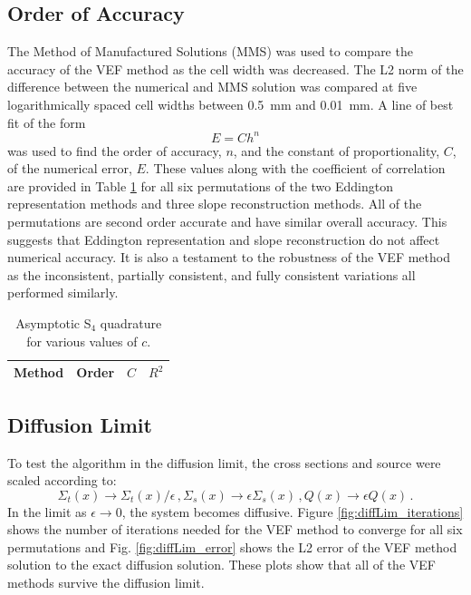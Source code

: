 \subsection{Order of Accuracy}
The Method of Manufactured Solutions (MMS) was used to compare the accuracy of the VEF method as the cell width was decreased. The L2 norm of the difference between the numerical and MMS solution was compared at five logarithmically spaced cell widths between \SI{0.5}{mm} and \SI{0.01}{mm}. A line of best fit of the form 
	\begin{equation} 
		E = C h^n 
	\end{equation}
was used to find the order of accuracy, $n$, and the constant of proportionality, $C$, of the numerical error, $E$. These values along with the coefficient of correlation are provided in Table \ref{tab:mms} for all six permutations of the two Eddington representation methods and three slope reconstruction methods. All of the permutations are second order accurate and have similar overall accuracy. This suggests that Eddington representation and slope reconstruction do not affect numerical accuracy. It is also a testament to the robustness of the VEF method as the inconsistent, partially consistent, and fully consistent variations all performed similarly. 
	\begin{table}[!h] \centering
	\begin{tabular}{|c|c|c|c|}
	\hline
	\hline
	Method & Order & $C$ & $R^2$ \\ 
	\hline
		
	\hline
	\hline
	\end{tabular}
	\caption{Asymptotic S$_4$ quadrature for various values of $c$.}
	\label{tab:mms}
	\end{table}
	\afterpage{\clearpage}

\subsection{Diffusion Limit}
To test the algorithm in the diffusion limit, the cross sections and source were scaled according to: 
	\begin{subequations} \label{res:scaling}
	\begin{equation} 
		\Sigma_t(x) \rightarrow \Sigma_t(x)/\epsilon\,, 
	\end{equation}
	\begin{equation}
		\Sigma_s(x) \rightarrow \epsilon \Sigma_s(x) \,,
	\end{equation}
	\begin{equation}
		Q(x) \rightarrow \epsilon Q(x)\,. 
	\end{equation}
	\end{subequations}
In the limit as $\epsilon \rightarrow 0$, the system becomes diffusive. Figure \ref{fig:diffLim_iterations} shows the number of iterations needed for the VEF method to converge for all six permutations and Fig. \ref{fig:diffLim_error} shows the L2 error of the VEF method solution to the exact diffusion solution. These plots show that all of the VEF methods survive the diffusion limit. 

